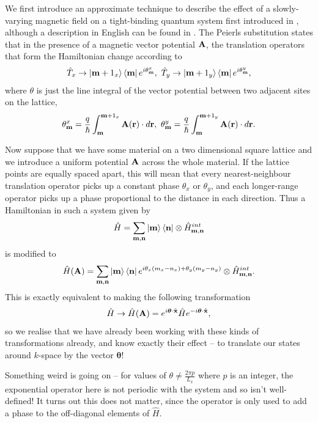 We first introduce an approximate technique to describe the effect of a slowly-varying magnetic field on a tight-binding quantum system first introduced in \cite{peierls_zur_1933}, although a description in English can be found in \cite{hofstadter_energy_1976}. The Peierls substitution states that in the presence of a magnetic vector potential $\bf A$, the translation operators that form the Hamiltonian change according to
\begin{align}
	\hat T_x \rightarrow \ket{\bf m + 1_x}\bra{\bf m} e^{i \theta_{\bf m}^x}, \ \hat T_y \rightarrow \ket{\bf m + 1_y}\bra{\bf m} e^{i \theta_{\bf m}^y},
\end{align}
where $\theta$ is just the line integral of the vector potential between two adjacent sites on the lattice,
\begin{align}
	\theta_{\bf m}^x = \frac{q}{\hbar}\int_{\bf m}^{\bf m + 1_x} \bf A(\bf r) \cdot d\bf r, \ \theta_{\bf m}^y = \frac{q}{\hbar}\int_{\bf m}^{\bf m + 1_y} \bf A(\bf r) \cdot d\bf r.
\end{align}\par
Now suppose that we have some material on a two dimensional square lattice and we introduce a uniform potential $\bf A$ across the whole material. If the lattice points are equally spaced apart, this will mean that every nearest-neighbour translation operator picks up a constant phase $\theta_x$ or $\theta_y$, and each longer-range operator picks up a phase proportional to the distance in each direction. Thus a Hamiltonian in such a system given by
\begin{align}
	\hat H  = \sum_{\bf m, \bf n} \ket{\bf m} \bra{\bf n} \otimes \hat H^{int}_{\bf m, \bf n}
\end{align}
is modified to
\begin{align}
	\hat H(\bf A)  = \sum_{\bf m, \bf n} \ket{\bf m} \bra{\bf n} e^{i \theta_x(m_x - n_x) + \theta_y(m_y - n_y)} \otimes \hat H^{int}_{\bf m, \bf n}.
\end{align}
This is exactly equivalent to making the following transformation
\begin{align}
	\hat H \rightarrow \hat H (\bf A) = e^{i \bm \theta \cdot \hat{ \bf x}} \hat H e^{-i \bm \theta \cdot  \hat{ \bf x}},
\end{align}
so we realise that we have already been working with these kinds of transformations already, and know exactly their effect -- to translate our states around $k$-space by the vector $\bm \theta$!

\begin{shaded}
	Something weird is going on -- for values of $\theta \neq \frac{2\pi p}{L_x}$ where $p$ is an integer, the exponential operator here is not periodic with the system and so isn't well-defined! It turns out this does not matter, since the operator is only used to add a phase to the off-diagonal elements of $\hat H$.
\end{shaded}

